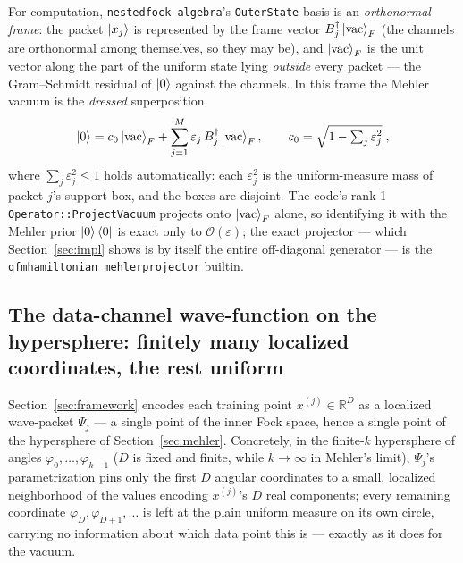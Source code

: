 \documentclass[11pt, a4paper]{article}
\newcommand{\Rset}{\mathbb{R}}
\begin{document}
For computation, \texttt{nested\textunderscore fock\textunderscore
algebra}'s \texttt{OuterState} basis is an \emph{orthonormal frame}: the
packet $\ket{x_j}$ is represented by the frame vector
$B_j^\dagger\ket{\mathrm{vac}}_F$ (the channels are orthonormal among
themselves, so they may be), and $\ket{\mathrm{vac}}_F$ is the unit vector
along the part of the uniform state lying \emph{outside} every packet ---
the Gram--Schmidt residual of $\ket{0}$ against the channels. In this frame
the Mehler vacuum is the \emph{dressed} superposition
\begin{equation}
  \ket{0}=c_0\ket{\mathrm{vac}}_F
  +\sum_{j=1}^M\varepsilon_j\,B_j^\dagger\ket{\mathrm{vac}}_F ,
  \qquad
  c_0=\sqrt{1-\textstyle\sum_j\varepsilon_j^2}\;,
  \label{eq:dressedvac}
\end{equation}
where $\sum_j\varepsilon_j^2\le1$ holds automatically: each
$\varepsilon_j^2$ is the uniform-measure mass of packet $j$'s support box,
and the boxes are disjoint. The code's rank-1
\texttt{Operator::ProjectVacuum} projects onto $\ket{\mathrm{vac}}_F$
alone, so identifying it with the Mehler prior $\ket{0}\bra{0}$ is exact
only to $\mathcal{O}(\varepsilon)$; the exact projector --- which
Section~\ref{sec:impl} shows is by itself the entire off-diagonal
generator --- is the \texttt{qfm\textunderscore hamiltonian\textunderscore
mehler\textunderscore projector} builtin.

\subsection{The data-channel wave-function on the hypersphere: finitely many
localized coordinates, the rest uniform}

Section~\ref{sec:framework} encodes each training point $x^{(j)}\in\Rset^D$
as a localized wave-packet $\Psi_j$ --- a single point of the inner Fock
space, hence a single point of the hypersphere of
Section~\ref{sec:mehler}. Concretely, in the finite-$k$ hypersphere of
angles $\varphi_0,\dots,\varphi_{k-1}$ ($D$ is fixed and finite, while
$k\to\infty$ in Mehler's limit), $\Psi_j$'s parametrization pins only the
first $D$ angular coordinates to a small, localized neighborhood of the
values encoding $x^{(j)}$'s $D$ real components; every remaining coordinate
$\varphi_D,\varphi_{D+1},\dots$ is left at the plain uniform measure on its
own circle, carrying no information about which data point this is ---
exactly as it does for the vacuum.
\end{document}
